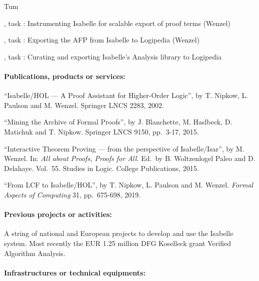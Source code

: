 \begin{sitedescription}{Tum}
\begin{compactitem}
 \item {}, task : 
    Instrumenting Isabelle for scalable export of proof terms (Wenzel) 
 \item {}, task : 
    Exporting the AFP from Isabelle to Logipedia (Wenzel) 
\item {}, task : 
    Curating and exporting Isabelle's Analysis library to Logipedia
\end{compactitem}

\paragraph{Publications, products or services:}

\begin{compactitem}
\item ``Isabelle/HOL --- A Proof Assistant for Higher-Order Logic'',
  by T. Nipkow, L. Paulson and M. Wenzel. Springer LNCS 2283, 2002.
\item ``Mining the Archive of Formal Proofs'', by J. Blanchette,
  M. Haslbeck, D. Matichuk and T. Nipkow. Springer LNCS 9150, pp.\ 3-17, 2015.
\item ``Interactive Theorem Proving --- from the perspective of Isabelle/Isar'',
by M. Wenzel. In: \emph{All about Proofs, Proofs for All.} Ed.\ by B. Woltzenlogel Paleo and D. Delahaye. Vol.\ 55. Studies in Logic. College Publications, 2015.
\item ``From LCF to Isabelle/HOL'', by T. Nipkow, L. Paulson and M. Wenzel.
\emph{Formal Aspects of Computing} 31, pp.\ 675-698, 2019.
\end{compactitem}

\paragraph{Previous projects or activities:}

\begin{compactitem}
\item A string of national and European projects to develop and use the Isabelle
system. Most recently the EUR 1.25 million DFG Koselleck grant Verified Algorithm Analysis.
\end{compactitem}

\paragraph{Infrastructures or technical equipments:}


\end{sitedescription}

